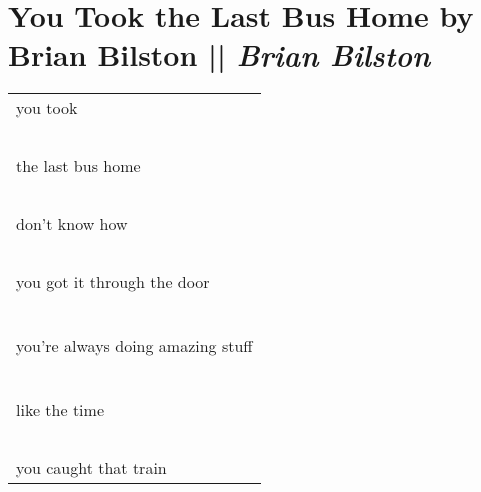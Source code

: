 
\section[You Took the Last Bus Home by Brian Bilston]{You Took the Last Bus Home by Brian Bilston || \emph{Brian Bilston} \hspace*{\fill}  \thepage}
\label{sec:last_bus_home.tex}
\vspace*{2.5cm}
\begin{center}
\begin{tabular}{l}
you took\\
\-\ \\the last bus home\\
\-\ \\don’t know how\\
\-\ \\you got it through the door\\
\-\ \\ \\you’re always doing amazing stuff\\
\-\ \\ \\like the time\\
\-\ \\you caught that train
\end{tabular}
\end{center}